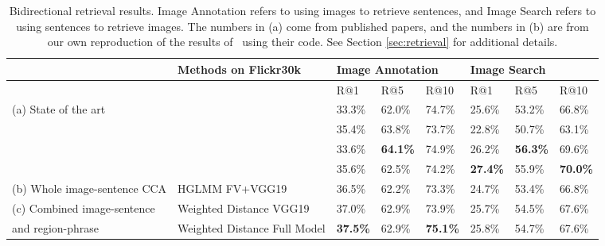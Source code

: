 \documentclass[twocolumn]{svjour3}
\begin{document}
 \begin{table*}[t]
\centering
\caption{Bidirectional retrieval results. Image Annotation refers to using images to retrieve sentences, and Image Search refers to using sentences to retrieve images. The numbers in (a) come from published papers, and the numbers in (b) are from our own reproduction of the results of~\cite{klein2014fisher} using their code. See Section \ref{sec:retrieval} for additional details.}
\label{table:flickr30k}
\small
\begin{center}
\begin{tabular}{|l|l|l|l|l|l|l|l|}
\hline
& Methods on Flickr30k                         & \multicolumn{3}{l|}{Image Annotation}                                                                                     & \multicolumn{3}{l|}{Image Search}                                                                                        \\ \hline
&                                             & R@1                                    & R@5                                    & R@10                                   & R@1                                    & R@5                                    & R@10                                   \\ \hline
(a) State of the art  
& {{\citet{klein2014fisher}}}   & { {33.3\%}} & { {62.0\%}} & { {74.7\%}} & { {25.6\%}} & { {53.2\%}} & { {66.8\%}} \\
& {{\citet{mao2014deep}}}   & { {35.4\%}} & { {63.8\%}} & { {73.7\%}} & { {22.8\%}} & { {50.7\%}} & { {63.1\%}} \\ 
& {{\citet{ma2015}}}   & { {33.6\%}} & { \textbf {64.1\%}} & { {74.9\%}} & { {26.2\%}} & { \textbf{56.3\%}} & { {69.6\%}} \\ 
& {{\citet{klein2015rnn}}}   & { {35.6\%}} & { {62.5\%}} & { {74.2\%}} & { \textbf{27.4\%}} & { {55.9\%}} & { \textbf{70.0\%}} \\ 
\hline
(b) Whole image-sentence CCA & {{HGLMM FV+VGG19}}   & { {36.5\%}} & { {62.2\%}} & { {73.3\%}} & { {24.7\%}} & { {53.4\%}} & { {66.8\%}} \\
\hline



(c) Combined image-sentence & {{Weighted Distance VGG19}}  & { 37.0\% }       & { 62.9\%}        & { 73.9\%}      & { {25.7\%}}      & { {54.5\%}}    & { {67.6\%}} \\ 
and region-phrase & {{Weighted Distance Full Model}}  & { \textbf{37.5\%}}       & { 62.9\%}        & { \textbf{75.1\%}}      & { 25.8\%}      & { 54.7\%}    & { 67.6\%} \\ 
\hline
\end{tabular}
\end{center}
\end{table*}
\end{document}
